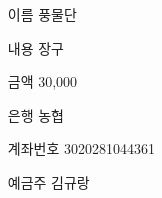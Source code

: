 \documentclass[	25pt, 
							a0paper, 
							portrait, %
							margin=0mm, %
							innermargin=10mm,  		%
							blockverticalspace=4mm, %
							colspace=5mm, 
							subcolspace=0mm
							]{tikzposter}
\begin{document}
\begin{columns}
%
%


		{
			\setlength{\leftmargini}{7em}			
			\setlength{\labelsep}{1em} %
			\begin{LARGE}
			\begin{itemize}
			\item [이름] 풍물단
			\item [내용] 장구
			\item [금액] 30,000
			\item [은행] 농협
			\item [계좌번호] 3020281044361
			\item [예금주] 김규랑
			\end{itemize}
			\end{LARGE}
		}		




\end{columns}
\end{document}
